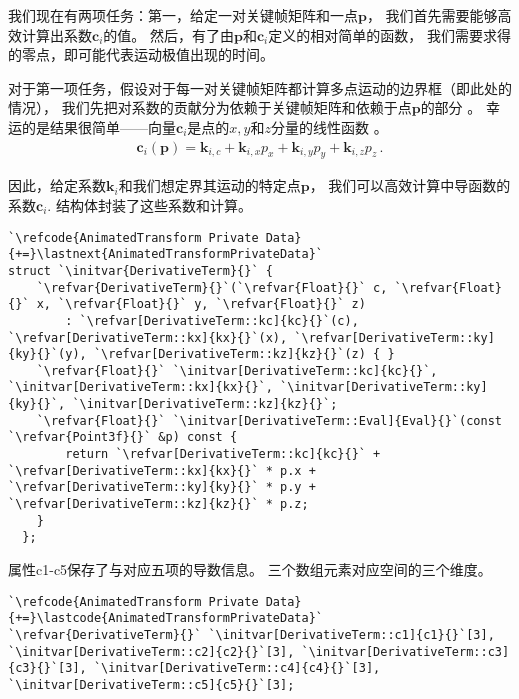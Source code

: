 我们现在有两项任务：第一，给定一对关键帧矩阵和一点$\bm p$，
我们首先需要能够高效计算出系数$\bm c_i$的值。
然后，有了由$\bm p$和$\bm c_i$定义的相对简单的函数，
我们需要求得的零点，即可能代表运动极值出现的时间。

对于第一项任务，假设对于每一对关键帧矩阵都计算多点运动的边界框（即此处的情况），
我们先把对系数的贡献分为依赖于关键帧矩阵和依赖于点$\bm p$的部分
。
幸运的是结果很简单——向量$\bm c_i$是点的$x,y$和$z$分量的线性函数
。
\begin{align*}
    \bm c_i(\bm p)=\bm k_{i,c}+\bm k_{i,x}p_x+\bm k_{i,y}p_y+\bm k_{i,z}p_z\, .
\end{align*}

因此，给定系数$\bm k_i$和我们想定界其运动的特定点$\bm p$，
我们可以高效计算中导函数的系数$\bm c_i$.
结构体封装了这些系数和计算。
\begin{lstlisting}
`\refcode{AnimatedTransform Private Data}{+=}\lastnext{AnimatedTransformPrivateData}`
struct `\initvar{DerivativeTerm}{}` {
    `\refvar{DerivativeTerm}{}`(`\refvar{Float}{}` c, `\refvar{Float}{}` x, `\refvar{Float}{}` y, `\refvar{Float}{}` z)
        : `\refvar[DerivativeTerm::kc]{kc}{}`(c), `\refvar[DerivativeTerm::kx]{kx}{}`(x), `\refvar[DerivativeTerm::ky]{ky}{}`(y), `\refvar[DerivativeTerm::kz]{kz}{}`(z) { }
    `\refvar{Float}{}` `\initvar[DerivativeTerm::kc]{kc}{}`, `\initvar[DerivativeTerm::kx]{kx}{}`, `\initvar[DerivativeTerm::ky]{ky}{}`, `\initvar[DerivativeTerm::kz]{kz}{}`;
    `\refvar{Float}{}` `\initvar[DerivativeTerm::Eval]{Eval}{}`(const `\refvar{Point3f}{}` &p) const {
        return `\refvar[DerivativeTerm::kc]{kc}{}` + `\refvar[DerivativeTerm::kx]{kx}{}` * p.x + `\refvar[DerivativeTerm::ky]{ky}{}` * p.y + `\refvar[DerivativeTerm::kz]{kz}{}` * p.z;
    }
  };
\end{lstlisting}

属性{\ttfamily c1}-{\ttfamily c5}保存了与对应五项的导数信息。
三个数组元素对应空间的三个维度。
\begin{lstlisting}
`\refcode{AnimatedTransform Private Data}{+=}\lastcode{AnimatedTransformPrivateData}`
`\refvar{DerivativeTerm}{}` `\initvar[DerivativeTerm::c1]{c1}{}`[3], `\initvar[DerivativeTerm::c2]{c2}{}`[3], `\initvar[DerivativeTerm::c3]{c3}{}`[3], `\initvar[DerivativeTerm::c4]{c4}{}`[3], `\initvar[DerivativeTerm::c5]{c5}{}`[3];
\end{lstlisting}

